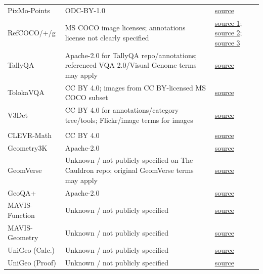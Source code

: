\begin{longtable}{@{}>{\raggedright\arraybackslash}p{}>{\raggedright\arraybackslash}p{}>{\raggedright\arraybackslash}p{}@{}}
PixMo-Points & ODC-BY-1.0 & \href{https://huggingface.co/datasets/allenai/pixmo-points}{source} \\
RefCOCO/+/g & MS COCO image licenses; annotations license not clearly specified & \href{https://web.archive.org/web/20220413011718/https://bvisionweb1.cs.unc.edu/licheng/referit/data/refcoco.zip}{source 1}; \href{https://web.archive.org/web/20220413011656/https://bvisionweb1.cs.unc.edu/licheng/referit/data/refcocog.zip}{source 2}; \href{https://web.archive.org/web/20220413012904/https://bvisionweb1.cs.unc.edu/licheng/referit/data/refcoco+.zip}{source 3} \\
TallyQA & Apache-2.0 for TallyQA repo/annotations; referenced VQA 2.0/Visual Genome terms may apply & \href{https://github.com/manoja328/TallyQA_dataset/raw/master/tallyqa.zip}{source} \\
TolokaVQA & CC BY 4.0; images from CC BY-licensed MS COCO subset & \href{https://www.kaggle.com/datasets/dustalov/toloka-wsdm-cup-2023-vqa}{source} \\
V3Det & CC BY 4.0 for annotations/category tree/tools; Flickr/image terms for images & \href{https://huggingface.co/datasets/yhcao/V3Det_Backup}{source} \\
\midrule
\rowcolor{instructcolor}\multicolumn{3}{l}{\textit{Math}} \\
CLEVR-Math & CC BY 4.0 & \href{https://huggingface.co/datasets/dali-does/clevr-math}{source} \\
Geometry3K & Apache-2.0 & \href{https://huggingface.co/datasets/lmms-lab/LLaVA-OneVision-Data/tree/main/Geometry3K(MathV360K)}{source} \\
GeomVerse & Unknown / not publicly specified on The Cauldron repo; original GeomVerse terms may apply & \href{https://huggingface.co/datasets/HuggingFaceM4/the_cauldron/tree/main/geomverse}{source} \\
GeoQA+ & Apache-2.0 & \href{https://huggingface.co/datasets/lmms-lab/LLaVA-OneVision-Data/tree/main/GeoQA+(MathV360K)}{source} \\
MAVIS-Function & Unknown / not publicly specified & \href{https://huggingface.co/datasets/CaraJ/MAVIS-Function}{source} \\
MAVIS-Geometry & Unknown / not publicly specified & \href{https://huggingface.co/datasets/CaraJ/MAVIS-Geometry}{source} \\
UniGeo (Calc.) & Unknown / not publicly specified & \href{https://drive.google.com/drive/folders/1weZAzuxCyNsXK3NoUGo_7FWCAMnG4Mh4}{source} \\
UniGeo (Proof) & Unknown / not publicly specified & \href{https://drive.google.com/drive/folders/1weZAzuxCyNsXK3NoUGo_7FWCAMnG4Mh4}{source} \\

\end{longtable}
